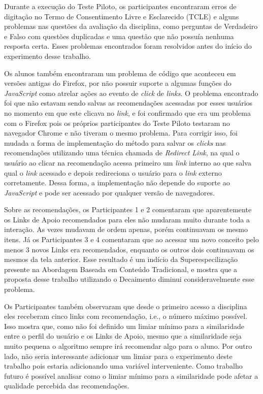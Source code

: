Durante a execução do Teste Piloto, os participantes encontraram erros de digitação no Termo de Consentimento Livre e Esclarecido (TCLE)
e alguns problemas nas questões da avaliação da disciplina, como perguntas de Verdadeiro e Falso com questões duplicadas e uma
questão que não possuía nenhuma resposta certa. Esses problemas encontrados foram resolvidos antes do início do experimento
desse trabalho.

Os alunos também encontraram um problema de código que aconteceu em versões antigas do Firefox, por não possuir suporte a
algumas funções do \textit{JavaScript} como atrelar ações ao evento de \textit{click} de \textit{links}. O problema encontrado foi que não estavam
sendo salvas as recomendações acessadas por esses usuários no momento em que este clicava no \textit{link}, e foi confirmado
que era um problema com o Firefox pois os próprios participantes do Teste Piloto testaram no navegador Chrome e não tiveram
o mesmo problema. Para corrigir isso, foi mudada a forma de implementação do método para salvar os \textit{clicks} nas recomendações
utilizando uma técnica chamada de \textit{Redirect Link}, na qual o usuário ao clicar na recomendação acessa primeiro um
\textit{link} interno ao \adaptweb que salva qual o \textit{link} acessado e depois redireciona o usuário para o \textit{link} externo corretamente.
Dessa forma, a implementação não depende do suporte ao \textit{JavaScript} e pode ser acessado por qualquer versão de navegadores.

Sobre as recomendações, os Participantes 1 e 2 comentaram que aparentemente os Links de Apoio recomendados para eles não
mudaram muito durante toda a interação. As vezes mudavam de ordem apenas, porém continuavam os mesmo itens. Já os Participantes
3 e 4 comentaram que ao acessar um novo conceito pelo menos 3 novos Links era recomendados, enquanto os outros dois continuavam
os mesmos da tela anterior. Esse resultado é um indício da Superespecilização presente na Abordagem Baseada em Conteúdo Tradicional,
e mostra que a proposta desse trabalho utilizando o Decaimento diminui consideravelmente esse problema.

Os Participantes também observaram que desde o primeiro acesso a disciplina eles receberam cinco links com recomendação, i.e.,
o número máximo possível. Isso mostra que, como não foi definido um limiar mínimo para a similaridade entre o perfil do usuário
e os Links de Apoio, mesmo que a similaridade seja muito pequena o algoritmo sempre irá recomendar algo para o aluno. Por
outro lado, não seria interessante adicionar um limiar para o experimento deste trabalho pois estaria adicionando uma
variável interveniente. Como trabalho futuro é possível analisar como o limiar mínimo para a similaridade pode afetar
a qualidade percebida das recomendações.

